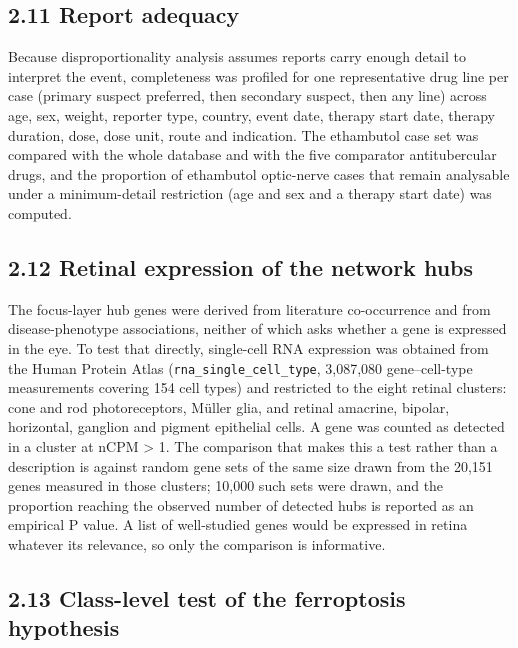 \documentclass[utf8]{FrontiersinVancouver}
\begin{document}
\subsection{2.11 Report adequacy}

Because disproportionality analysis assumes reports carry enough detail to interpret the event, completeness was profiled for one representative drug line per case (primary suspect preferred, then secondary suspect, then any line) across age, sex, weight, reporter type, country, event date, therapy start date, therapy duration, dose, dose unit, route and indication. The ethambutol case set was compared with the whole database and with the five comparator antitubercular drugs, and the proportion of ethambutol optic-nerve cases that remain analysable under a minimum-detail restriction (age and sex and a therapy start date) was computed.

\subsection{2.12 Retinal expression of the network hubs}

The focus-layer hub genes were derived from literature co-occurrence and from disease-phenotype associations, neither of which asks whether a gene is expressed in the eye. To test that directly, single-cell RNA expression was obtained from the Human Protein Atlas (\texttt{rna\_single\_cell\_type}, 3,087,080 gene--cell-type measurements covering 154 cell types) and restricted to the eight retinal clusters: cone and rod photoreceptors, Müller glia, and retinal amacrine, bipolar, horizontal, ganglion and pigment epithelial cells. A gene was counted as detected in a cluster at nCPM > 1. The comparison that makes this a test rather than a description is against random gene sets of the same size drawn from the 20,151 genes measured in those clusters; 10,000 such sets were drawn, and the proportion reaching the observed number of detected hubs is reported as an empirical P value. A list of well-studied genes would be expressed in retina whatever its relevance, so only the comparison is informative.

\subsection{2.13 Class-level test of the ferroptosis hypothesis}
\end{document}

